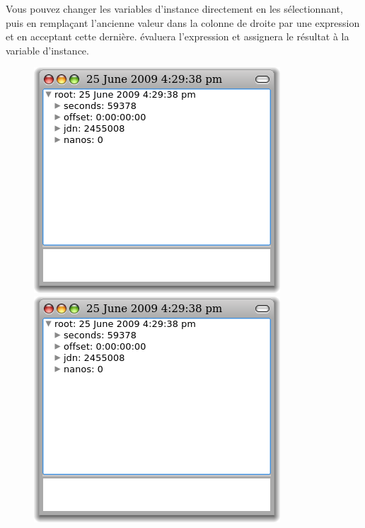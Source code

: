 \documentclass[a4paper,10pt,twoside]{book}
\begin{document}
Vous pouvez changer les variables d'instance directement en les s\'electionnant,
puis en rempla\c{c}ant l'ancienne valeur dans la colonne de droite
par une expression \pharo et en acceptant cette derni\`ere.
\pharo \'evaluera l'expression et assignera le r\'esultat \`a la variable
d'instance.

\begin{figure}[tbp]
\begin{minipage}{0.48\textwidth}
	\begin{center}
	\ifluluelse
		{\includegraphics[width=\textwidth]{exploreTimeStampNow}}
		{\includegraphics[scale=0.7]{exploreTimeStampNow}}
	\end{center}

\end{minipage}
\end{figure}
\end{document}
